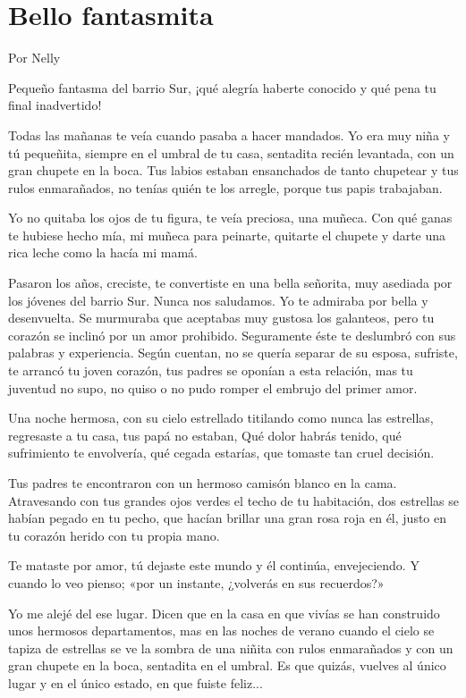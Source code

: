 \documentclass[11pt,twoside,openright,a5paper]{book}
\begin{document}
\section*{Bello fantasmita}
                                                                                          \begin{flushright}Por Nelly\end{flushright}

Pequeño fantasma del barrio Sur, ¡qué alegría haberte conocido  y qué pena tu final inadvertido!

Todas las mañanas te veía cuando pasaba a hacer mandados. Yo era muy niña y tú pequeñita, siempre en el umbral de tu casa, sentadita recién levantada, con un gran chupete en la boca. Tus labios estaban ensanchados de tanto chupetear y tus rulos enmarañados, no tenías quién te los arregle, porque tus papis trabajaban.

Yo no quitaba los ojos de tu figura, te veía preciosa, una muñeca. Con qué ganas te hubiese hecho mía, mi muñeca para peinarte, quitarte el chupete y darte una rica leche como la hacía mi mamá.

Pasaron los años, creciste, te convertiste en  una bella señorita, muy asediada por los jóvenes del barrio Sur. Nunca nos saludamos. Yo te admiraba por bella y desenvuelta. Se murmuraba que aceptabas muy gustosa los galanteos, pero tu corazón se inclinó por un amor prohibido. Seguramente éste te deslumbró con sus palabras y experiencia. Según cuentan, no se quería separar de su esposa, sufriste, te arrancó tu joven corazón, tus padres se oponían a esta relación, mas tu juventud no supo, no quiso o no pudo romper el embrujo del primer amor.

Una noche hermosa, con su cielo estrellado titilando como nunca las estrellas, regresaste a tu casa, tus papá no estaban, Qué dolor habrás tenido, qué sufrimiento te envolvería, qué cegada estarías, que tomaste tan cruel decisión.

Tus padres te encontraron con un hermoso camisón blanco en la cama. Atravesando con tus grandes ojos verdes el techo de tu habitación, dos estrellas se habían pegado en tu pecho, que hacían brillar una gran rosa roja en él, justo en tu corazón herido con tu propia mano.

Te mataste por amor, tú dejaste este mundo y él continúa, envejeciendo. Y cuando lo veo pienso; «por un instante, ¿volverás en sus recuerdos?»

Yo me  alejé del ese lugar. Dicen que en la casa en que vivías se han construido unos hermosos departamentos, mas en las noches de verano cuando el cielo se tapiza de estrellas se ve la sombra de una niñita con rulos enmarañados y con un gran chupete en la boca, sentadita en el umbral. Es que quizás, vuelves al único lugar y en el único estado, en que fuiste feliz...
\end{document}
